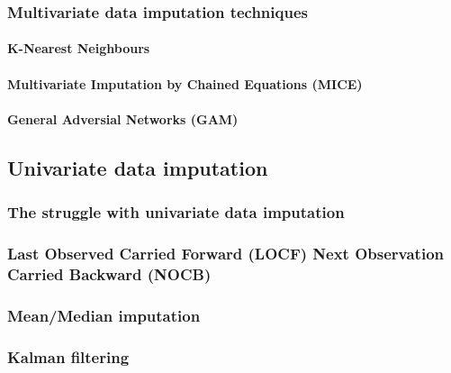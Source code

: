 \documentclass[
]{report}
\begin{document}
\subsubsection{Multivariate data imputation
techniques}\label{multivariate-data-imputation-techniques}

\paragraph{K-Nearest Neighbours}\label{k-nearest-neighbours}

\paragraph{Multivariate Imputation by Chained Equations
(MICE)}\label{multivariate-imputation-by-chained-equations-mice}

\paragraph{General Adversial Networks
(GAM)}\label{general-adversial-networks-gam}

\subsection{Univariate data
imputation}\label{univariate-data-imputation}

\subsubsection{The struggle with univariate data
imputation}\label{the-struggle-with-univariate-data-imputation}

\subsubsection{Last Observed Carried Forward (LOCF) Next Observation
Carried Backward
(NOCB)}\label{last-observed-carried-forward-locf-next-observation-carried-backward-nocb}

\subsubsection{Mean/Median imputation}\label{meanmedian-imputation}

\subsubsection{Kalman filtering}\label{kalman-filtering}
\end{document}
